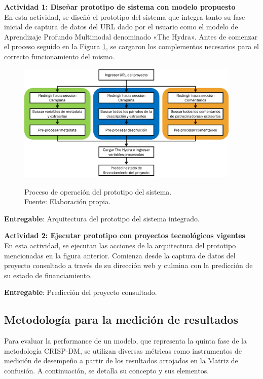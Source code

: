 \textbf{Actividad 1: Diseñar prototipo de sistema con modelo propuesto}
\\
En esta actividad, se diseñó el prototipo del sistema que integra tanto su fase inicial de captura de datos del URL dado por el usuario como el modelo de Aprendizaje Profundo Multimodal denominado «The Hydra». Antes de comenzar el proceso seguido en la Figura \ref{3:fig10}, se cargaron los complementos necesarios para el correcto funcionamiento del mismo.

\begin{figure}[h]
	\begin{center}
		\includegraphics[width=0.95\textwidth]{5/figures/demo_flux.png}
		\caption[Proceso de operación del prototipo del sistema]{Proceso de operación del prototipo del sistema.\\
			Fuente: Elaboración propia.}
		\vspace{-0.75cm}
		\label{3:fig10}
	\end{center}
\end{figure}

\textbf{Entregable}: Arquitectura del prototipo del sistema integrado.

\vspace{0.25cm}
\textbf{Actividad 2: Ejecutar prototipo con proyectos tecnológicos vigentes}
\\
En esta actividad, se ejecutan las acciones de la arquitectura del prototipo mencionadas en la figura anterior. Comienza desde la captura de datos del proyecto consultado a través de su dirección web y culmina con la predicción de su estado de financiamiento.

\textbf{Entregable}: Predicción del proyecto consultado.

\vspace{0.5cm}
\subsection{Metodología para la medición de resultados}
Para evaluar la performance de un modelo, que representa la quinta fase de la metodología CRISP-DM, se utilizan diversas métricas como instrumentos de medición de desempeño a partir de los resultados arrojados en la Matriz de confusión. A continuación, se detalla su concepto y sus elementos.

